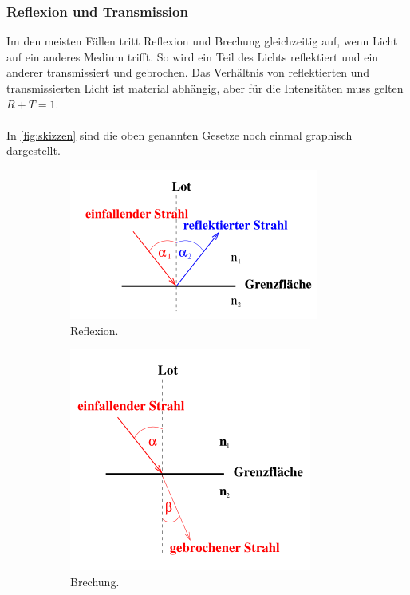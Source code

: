 \subsubsection{Reflexion und Transmission}
\label{sec:Reflexion_und_Transmission}
Im den meisten Fällen tritt Reflexion und Brechung gleichzeitig auf, wenn Licht auf ein anderes Medium trifft. So wird ein
Teil des Lichts reflektiert und ein anderer transmissiert und gebrochen. Das Verhältnis von reflektierten und transmissierten
Licht ist material abhängig, aber für die Intensitäten muss gelten $R + T = 1$.\\
\\
In \autoref{fig:skizzen} sind die oben genannten Gesetze noch einmal graphisch dargestellt.
\begin{figure}
    \begin{subfigure}{0.3\textwidth}
        \centering
        \includegraphics{Bilder/Reflexion.png}
        \caption{Reflexion.}
        \label{fig:Reflexion}
    \end{subfigure}
    \hfill
    \begin{subfigure}{0.3\textwidth}
        \centering
        \includegraphics{Bilder/Brechung.png}
        \caption{Brechung.}
        \label{fig:Brechung}
    \end{subfigure}
    \hfill
    \begin{subfigure}{0.3\textwidth}

\end{subfigure}
\end{figure}
